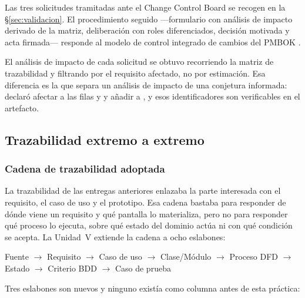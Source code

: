 Las tres solicitudes tramitadas ante el Change Control Board se recogen en la
\S\ref{sec:validacion}. El procedimiento seguido ---formulario con análisis de impacto derivado de la
matriz, deliberación con roles diferenciados, decisión motivada y acta firmada--- responde al modelo
de control integrado de cambios del PMBOK \cite{pmbok7}.

El análisis de impacto de cada solicitud se obtuvo recorriendo la matriz de trazabilidad y filtrando
por el requisito afectado, no por estimación. Esa diferencia es la que separa un análisis de impacto
de una conjetura informada:  declaró afectar a las filas  y  y añadir
 a , y esos identificadores son verificables en el artefacto.


\subsection{Trazabilidad extremo a extremo}

\subsubsection*{Cadena de trazabilidad adoptada}

La trazabilidad de las entregas anteriores enlazaba la parte interesada con el requisito, el caso de
uso y el prototipo. Esa cadena bastaba para responder de dónde viene un requisito y qué pantalla lo
materializa, pero no para responder qué proceso lo ejecuta, sobre qué estado del dominio actúa ni
con qué condición se acepta. La Unidad~V extiende la cadena a ocho eslabones:

\begin{center}
\footnotesize
Fuente $\rightarrow$ Requisito $\rightarrow$ Caso de uso $\rightarrow$ Clase/Módulo $\rightarrow$
Proceso DFD $\rightarrow$ Estado $\rightarrow$ Criterio BDD $\rightarrow$ Caso de prueba
\end{center}

\noindent
Tres eslabones son nuevos y ninguno existía como columna antes de esta práctica:

